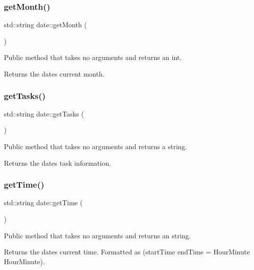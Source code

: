 \subsubsection{\texorpdfstring{get\+Month()}{getMonth()}}
{\footnotesize\ttfamily std\+::string date\+::get\+Month (\begin{DoxyParamCaption}{ }\end{DoxyParamCaption})}

Public method that takes no arguments and returns an int. \begin{DoxyReturn}{Returns}
the date\textquotesingle{}s current month. 
\end{DoxyReturn}
\mbox{\label{classdate_a82d3639e939f437039f01ff702dca8a6}} 
\subsubsection{\texorpdfstring{get\+Tasks()}{getTasks()}}
{\footnotesize\ttfamily std\+::string date\+::get\+Tasks (\begin{DoxyParamCaption}{ }\end{DoxyParamCaption})}

Public method that takes no arguments and returns a string. \begin{DoxyReturn}{Returns}
the date\textquotesingle{}s task information. 
\end{DoxyReturn}
\mbox{\label{classdate_abc00445f7dad83e1b6bc7c7a27736ef5}} 
\subsubsection{\texorpdfstring{get\+Time()}{getTime()}}
{\footnotesize\ttfamily std\+::string date\+::get\+Time (\begin{DoxyParamCaption}{ }\end{DoxyParamCaption})}

Public method that takes no arguments and returns an string. \begin{DoxyReturn}{Returns}
the date\textquotesingle{}s current time. Formatted as (start\+Time end\+Time = Hour\+Minute Hour\+Minute). 
\end{DoxyReturn}
\mbox{\label{classdate_af1fb1701086c8aac3b480ff52f48065b}} 
